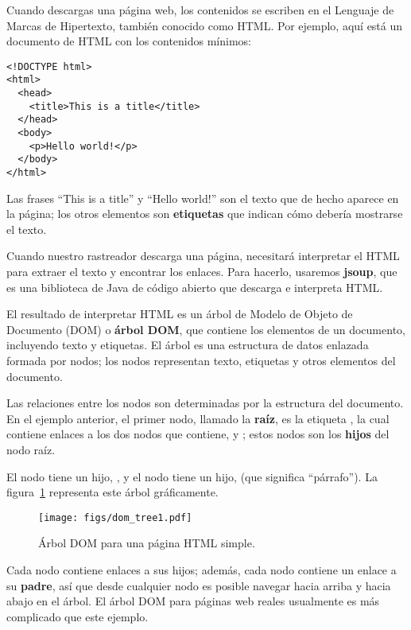 \documentclass[12pt]{book}
\theoremstyle{exercise}
\begin{document}
Cuando descargas una página web, los contenidos se escriben en
el Lenguaje de Marcas de Hipertexto, también conocido como HTML.
Por ejemplo, aquí está un documento de HTML con los contenidos mínimos:

\begin{verbatim}
<!DOCTYPE html>
<html>
  <head>
    <title>This is a title</title>
  </head>
  <body>
    <p>Hello world!</p>
  </body>
</html>
\end{verbatim}

Las frases ``This is a title'' y ``Hello world!'' son el texto que
de hecho aparece en la página; los otros elementos son \textbf{etiquetas} que
indican cómo debería mostrarse el texto.


Cuando nuestro rastreador descarga una página, necesitará interpretar el HTML
para extraer el texto y encontrar los enlaces. Para hacerlo, usaremos
\textbf{jsoup}, que es una biblioteca de Java de código abierto que descarga e
interpreta HTML.


El resultado de interpretar HTML es un árbol de Modelo de Objeto de Documento (DOM) o
\textbf{árbol DOM}, que contiene los elementos de un documento, incluyendo texto y
etiquetas. El árbol es una estructura de datos enlazada formada por nodos; los
nodos representan texto, etiquetas y otros elementos del documento.


Las relaciones entre los nodos son determinadas por la estructura del
documento. En el ejemplo anterior, el primer nodo, llamado la
\textbf{raíz}, es la etiqueta , la cual
contiene enlaces a los dos nodos que contiene,
 y
; estos nodos son los
\textbf{hijos} del nodo raíz.

El nodo  tiene un hijo,
, y el nodo
 tiene un hijo,
 (que significa ``párrafo''). 
La figura~\ref{fig-dom1}
 representa este árbol gráficamente.

\begin{figure}
\centering
\texttt{[image: figs/dom\_tree1.pdf]}
\caption{Árbol DOM para una página HTML simple.}
\label{fig-dom1}
\end{figure}


Cada nodo contiene enlaces a sus hijos; además, cada nodo
contiene un enlace a su \textbf{padre}, así que desde cualquier nodo es posible
navegar hacia arriba y hacia abajo en el árbol. El árbol DOM para páginas web reales
usualmente es más complicado que este ejemplo.
\end{document}
